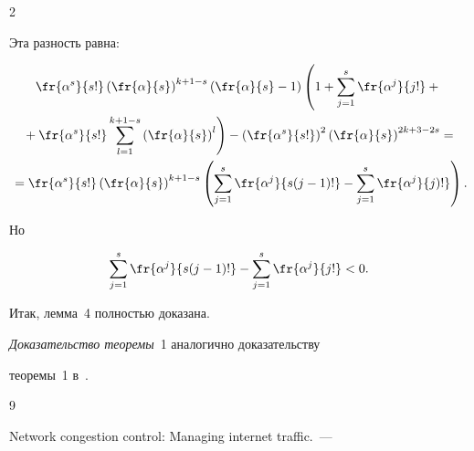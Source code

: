 \begin{multicols}{2}
{Эта разность равна:


\begin{multline*}


\fr{\alpha^s}{s!} \left(\fr{\alpha}{s}\right)^{k+1-s}\left(\fr{\alpha}{s}-1\right)


\left(


\vphantom{\sum\limits_{l=1}^{k+1-s}}


1+\sum\limits_{j=1}^s \fr{\alpha^j}{j!}+{}\right.\\


\left.{}+


\fr{\alpha^s}{s!} \sum\limits_{l=1}^{k+1-s}\left(\fr{\alpha}{s}\right)^{l}\right)-


\left(\fr{\alpha^s}{s!}\right)^2\left(\fr{\alpha}{s}\right)^{2k+3-2s}={}


\\


{}=\fr{\alpha^s}{s!}\left(\fr{\alpha}{s}\right)^{k+1-s}


\left(\sum\limits_{j=1}^s\fr{\alpha^j}{s(j-1)!}-


\sum\limits_{j=1}^s\fr{\alpha^j}{j)!}\right).


\end{multline*}


Но


$$


\sum\limits_{j=1}^s\fr{\alpha^j}{s(j-1)!}- \sum\limits_{j=1}^s\fr{\alpha^j}{j!}<0.


$$


Итак, лемма~4 полностью доказана.





\textit{Доказательство теоремы}~1 аналогично доказательству


теоремы~1 в~\cite{7-aga}.





}








{\small\frenchspacing


 {%




 \begin{thebibliography}{9}




 Network congestion control: Managing internet traffic.~--- 



\end{thebibliography}}}
\end{multicols}
